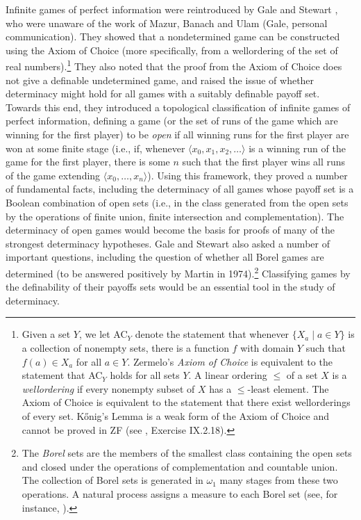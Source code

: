 \documentclass{book}%
\begin{document}
Infinite games of perfect information were reintroduced by Gale and
Stewart , who were unaware of the work of Mazur,
Banach and Ulam (Gale, personal communication). They showed that a nondetermined game can be
constructed using the Axiom of Choice (more specifically, from a
wellordering of the set of real numbers).\footnote{Given a set $Y$, we let AC$_{Y}$
denote the statement that whenever $\{ X_{a} \mid a \in Y \}$
is a collection of nonempty sets, there is a
function $f$ with domain $Y$ such that $f(a) \in X_{a}$ for all $a
\in Y$. Zermelo's
\emph{Axiom of Choice}  is
equivalent to the statement that AC$_{Y}$ holds for all sets $Y$. A linear ordering $\leq$ of a set $X$ is a
\emph{wellordering} if every nonempty subset of
$X$ has a $\leq$-least element. The Axiom of Choice is equivalent to
the statement that there exist wellorderings of every set.
K\H{o}nig's Lemma is a weak form of the Axiom of Choice and cannot
be proved in ZF (see \cite{Levy:settheory}, Exercise IX.2.18).}
They also noted that the proof from the Axiom of Choice does not
give a definable undetermined game, and raised the issue of whether
determinacy might hold for all games with a suitably definable
payoff set. Towards this end, they introduced a topological
classification of infinite games of perfect information, defining a
game (or the set of runs of the game which are winning for the first
player) to be \emph{open} if all winning runs for
the first player are won at some finite stage (i.e., if, whenever
$\langle x_{0},x_{1},x_{2},\ldots\rangle$ is a winning run of the
game for the first player, there is some $n$ such that the first
player wins all runs of the game extending $\langle
x_{0},\ldots,x_{n}\rangle$). Using this framework, they proved a
number of fundamental facts, including the determinacy of all games
whose payoff set is a Boolean combination of open sets (i.e., in the
class generated from the open sets by the operations of finite
union, finite intersection and complementation). The determinacy of
open games would become the basis for proofs of many of the strongest
determinacy hypotheses. Gale and Stewart also asked a number of important
questions, including the question of whether all Borel games are
determined (to be answered positively by Martin 
in 1974).\footnote{The \emph{Borel} sets are the members of the
smallest class containing the open sets and closed under the operations of
complementation and countable union. The collection of Borel sets is generated in $\omega_{1}$
many stages from these two operations. A natural process assigns a measure to each Borel set (see, for instance,
\cite{Halmos:measuretheory}).}
Classifying games by the definability of their payoffs sets would
be an essential tool in the study of determinacy.
\end{document}
